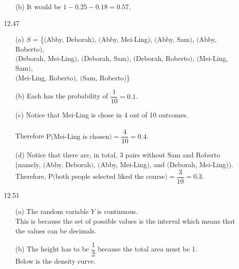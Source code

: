 \documentclass[11pt, a4paper]{article}
\begin{document}
\begin{itemize}
\begin{itemize}
\item[(b)]
It would be $1 - 0.25 - 0.18 = 0.57$.
\end{itemize}

\item[]
\item[]

\item[12.47]
\begin{itemize}
\item[(a)]
$S$ = \{$($Abby, Deborah$)$, $($Abby, Mei-Ling$)$, $($Abby, Sam$)$, $($Abby, Roberto$)$,\\
$($Deborah, Mei-Ling$)$, $($Deborah, Sam$)$, $($Deborah, Roberto$)$, $($Mei-Ling, Sam$)$,\\
$($Mei-Ling, Roberto$)$, $($Sam, Roberto$)$\}

\item[]

\item[(b)]
Each has the probability of $\dfrac{1}{10} = 0.1$.

\item[]

\item[(c)]
Notice that Mei-Ling is chose in 4 out of 10 outcomes.\\
\vspace{0.00125cm}\\
Therefore $\text{P$($Mei-Ling is chosen$)$} = \dfrac{4}{10} = 0.4$.

\item[]

\item[(d)]
Notice that there are, in total, 3 pairs without Sam and Roberto (namely, $($Abby, Deborah$)$, $($Abby, Mei-Ling$)$, and $($Deborah, Mei-Ling$)$).\\
Therefore, $\text{P$($both people selected liked the course$)$} = \dfrac{3}{10} = 0.3$.
\end{itemize}

\newpage

\item[12.51]
\begin{itemize}
\item[(a)]
The random variable $Y$ is continuous.\\
This is because the set of possible values is the interval which means that the values can be decimals.

\item[]

\item[(b)]
The height has to be $\dfrac{1}{2}$ because the total area must be 1.\\
Below is the density curve.
\begin{figure}[h]
    \centering
\end{figure}
\end{itemize}
\end{itemize}
\end{document}
